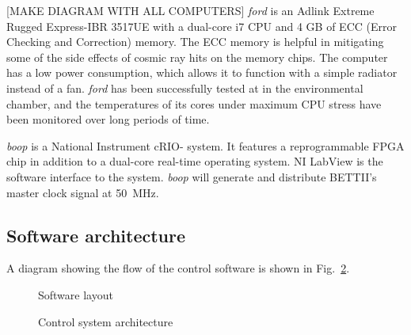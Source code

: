 [MAKE DIAGRAM WITH ALL COMPUTERS]
\textit{ford} is an Adlink Extreme Rugged Express-IBR 3517UE with a dual-core i7 CPU and 4 GB of ECC (Error Checking and Correction) memory. The ECC memory is helpful in mitigating some of the side effects of cosmic ray hits on the memory chips. The computer has a low power consumption, which allows it to function with a simple radiator instead of a fan. 
\textit{ford} has been successfully tested at in the environmental chamber, and the temperatures of its cores under maximum CPU stress have been monitored over long periods of time. 

\textit{boop} is a National Instrument cRIO- system. It features a reprogrammable FPGA chip in addition to a dual-core real-time operating system. NI LabView is the software interface to the system. \textit{boop} will generate and distribute BETTII's master clock signal at \SI{50}{\mega\hertz}.

\subsection{Software architecture}

A diagram showing the flow of the control software is shown in Fig.~\ref{fig:ControlSystem}. 
\begin{figure}[!ht]
	\centering
	
	\caption[Software diagram]{Software layout}
	\label{fig:SoftwareFlow}
    \end{figure}


\begin{figure}[!ht]
	\centering
	
	\caption[Control System Design]{Control system architecture}
	\label{fig:ControlSystem}
    \end{figure}

